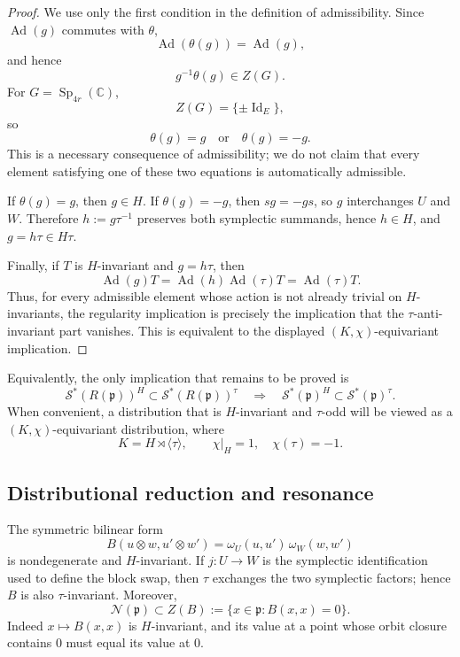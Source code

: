 \documentclass[11pt,reqno]{amsart}
\numberwithin{equation}{section}
\theoremstyle{definition}
\theoremstyle{remark}
\newcommand{\C}{\mathbb C}
\newcommand{\Sp}{\operatorname{Sp}}
\newcommand{\Ad}{\operatorname{Ad}}
\newcommand{\Id}{\operatorname{Id}}
\newcommand{\cN}{\mathcal N}
\newcommand{\cS}{\mathcal S}
\begin{document}
\begin{proof}
We use only the first condition in the definition of admissibility.
Since \(\Ad(g)\) commutes with \(\theta\),
\[
\Ad(\theta(g))=\Ad(g),
\]
and hence
\[
g^{-1}\theta(g)\in Z(G).
\]
For \(G=\Sp_{4r}(\C)\),
\[
Z(G)=\{\pm\Id_E\},
\]
so
\[
\theta(g)=g
\quad\text{or}\quad
\theta(g)=-g.
\]
This is a necessary consequence of admissibility; we do not claim that
every element satisfying one of these two equations is automatically
admissible.

If \(\theta(g)=g\), then \(g\in H\).  If \(\theta(g)=-g\), then
\(sg=-gs\), so \(g\) interchanges \(U\) and \(W\).  Therefore
\(h:=g\tau^{-1}\) preserves both symplectic summands, hence \(h\in H\), and
\(g=h\tau\in H\tau\).

Finally, if \(T\) is \(H\)-invariant and \(g=h\tau\), then
\[
\Ad(g)T=\Ad(h)\Ad(\tau)T=\Ad(\tau)T.
\]
Thus, for every admissible element whose action is not already trivial on
\(H\)-invariants, the regularity implication is precisely the implication
that the \(\tau\)-anti-invariant part vanishes.  This is equivalent to the
displayed \((K,\chi)\)-equivariant implication.
\end{proof}

Equivalently, the only implication that remains to be proved is
\begin{equation}\label{cii:eq:regularity-implication}
\cS^*(R(\mathfrak p))^H
\subset
\cS^*(R(\mathfrak p))^\tau
\quad\Longrightarrow\quad
\cS^*(\mathfrak p)^H
\subset
\cS^*(\mathfrak p)^\tau.
\end{equation}
When convenient, a distribution that is \(H\)-invariant and
\(\tau\)-odd will be viewed as a \((K,\chi)\)-equivariant distribution,
where
\[
K=H\rtimes\langle\tau\rangle,
\qquad
\chi|_H=1,\quad \chi(\tau)=-1.
\]

\subsection{Distributional reduction and resonance}
\label{cii:sec:distributional}

The symmetric bilinear form
\begin{equation}\label{cii:eq:B}
B(u\otimes w,u'\otimes w')
=
\omega_U(u,u')\,\omega_W(w,w')
\end{equation}
is nondegenerate and \(H\)-invariant.  If \(j:U\to W\) is the symplectic
identification used to define the block swap, then \(\tau\) exchanges the
two symplectic factors; hence \(B\) is also \(\tau\)-invariant.  Moreover,
\begin{equation}\label{cii:eq:nilcone-isotropic}
\cN(\mathfrak p)\subset
Z(B):=\{x\in\mathfrak p:B(x,x)=0\}.
\end{equation}
Indeed \(x\mapsto B(x,x)\) is \(H\)-invariant, and its value at a point
whose orbit closure contains \(0\) must equal its value at \(0\).
\end{document}
